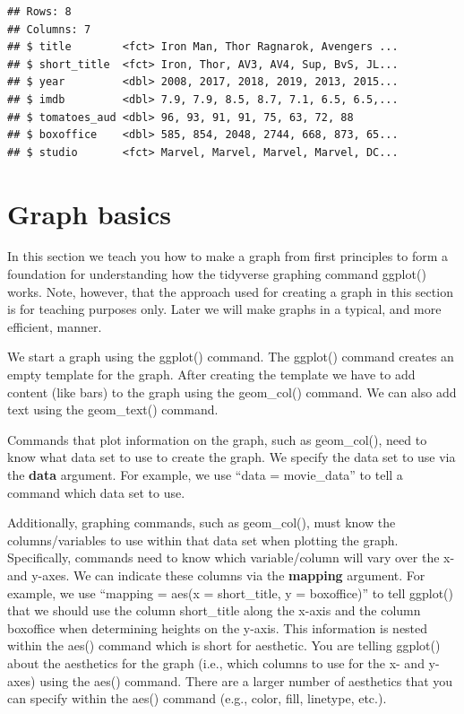 \documentclass[
]{krantz}
\begin{document}
\begin{verbatim}
## Rows: 8
## Columns: 7
## $ title        <fct> Iron Man, Thor Ragnarok, Avengers ...
## $ short_title  <fct> Iron, Thor, AV3, AV4, Sup, BvS, JL...
## $ year         <dbl> 2008, 2017, 2018, 2019, 2013, 2015...
## $ imdb         <dbl> 7.9, 7.9, 8.5, 8.7, 7.1, 6.5, 6.5,...
## $ tomatoes_aud <dbl> 96, 93, 91, 91, 75, 63, 72, 88
## $ boxoffice    <dbl> 585, 854, 2048, 2744, 668, 873, 65...
## $ studio       <fct> Marvel, Marvel, Marvel, Marvel, DC...
\end{verbatim}

\hypertarget{graph-basics}{%
\section{Graph basics}\label{graph-basics}}

In this section we teach you how to make a graph from first principles to form a foundation for understanding how the tidyverse graphing command ggplot() works. Note, however, that the approach used for creating a graph in this section is for teaching purposes only. Later we will make graphs in a typical, and more efficient, manner.

We start a graph using the ggplot() command. The ggplot() command creates an empty template for the graph. After creating the template we have to add content (like bars) to the graph using the geom\_col() command. We can also add text using the geom\_text() command.

Commands that plot information on the graph, such as geom\_col(), need to know what data set to use to create the graph. We specify the data set to use via the \textbf{data} argument. For example, we use ``data = movie\_data'' to tell a command which data set to use.

Additionally, graphing commands, such as geom\_col(), must know the columns/variables to use within that data set when plotting the graph. Specifically, commands need to know which variable/column will vary over the x- and y-axes. We can indicate these columns via the \textbf{mapping} argument. For example, we use ``mapping = aes(x = short\_title, y = boxoffice)'' to tell ggplot() that we should use the column short\_title along the x-axis and the column boxoffice when determining heights on the y-axis. This information is nested within the aes() command which is short for aesthetic. You are telling ggplot() about the aesthetics for the graph (i.e., which columns to use for the x- and y-axes) using the aes() command. There are a larger number of aesthetics that you can specify within the aes() command (e.g., color, fill, linetype, etc.).
\end{document}

